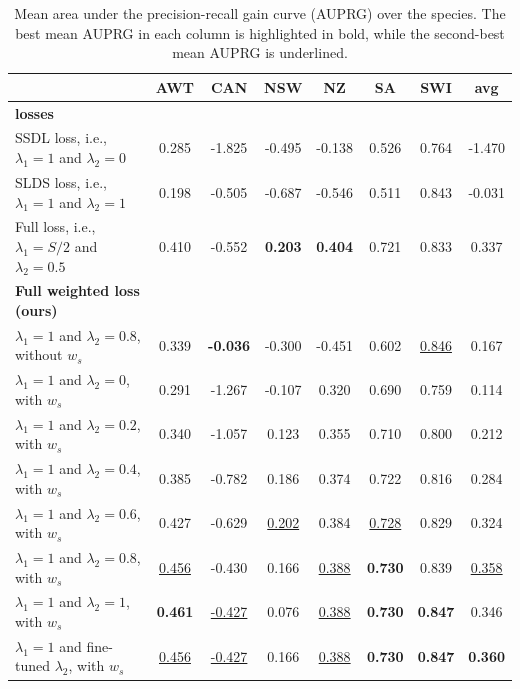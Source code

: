 \begin{table}[]
\centering
\caption{Mean area under the precision-recall gain curve (AUPRG) over the species. The best mean AUPRG in each column is highlighted in bold, while the second-best mean AUPRG is underlined.}

\setlength{\tabcolsep}{0.46\tabcolsep}  %
\renewcommand{\arraystretch}{1.2} %
\begin{tabular}{lccccccc}
                                                                          & AWT   & CAN   & NSW   & NZ    & SA    & SWI   & \textbf{avg}   \\ 
    \hline \hline
    \textbf{\cite{cole2023spatial} losses} \\
    SSDL loss, i.e., $\lambda_1 = 1$ and $\lambda_2=0$                    & 0.285 & -1.825 & -0.495 & -0.138 & 0.526 & 0.764 & -1.470 \\
    SLDS loss, i.e., $\lambda_1 = 1$ and $\lambda_2=1$                    & 0.198 & -0.505 & -0.687 & -0.546 & 0.511 & 0.843 & -0.031 \\
    Full loss, i.e., $\lambda_1 = S/2$ and $\lambda_2=0.5$                & 0.410 & -0.552 & \textbf{0.203} & \textbf{0.404} & 0.721 & 0.833 & 0.337 \\
    \hline \hline
    \textbf{Full weighted loss (ours)} \\  
    $\lambda_1=1 $ and $ \lambda_2=0.8$, without $w_s$                         & 0.339 & \textbf{-0.036} & -0.300 & -0.451 & 0.602 & \underline{0.846} & 0.167 \\
    \hline
    $\lambda_1=1 $ and $ \lambda_2=0$, with $w_s$                         & 0.291 & -1.267 & -0.107 & 0.320 & 0.690 & 0.759 & 0.114 \\
    $\lambda_1=1 $ and $ \lambda_2=0.2$, with $w_s$                       & 0.340 & -1.057 & 0.123 & 0.355 & 0.710 & 0.800 & 0.212 \\
    $\lambda_1=1 $ and $ \lambda_2=0.4$, with $w_s$                       & 0.385 & -0.782 & 0.186 & 0.374 & 0.722 & 0.816 & 0.284 \\
    $\lambda_1=1 $ and $ \lambda_2=0.6$, with $w_s$                       & 0.427 & -0.629 & \underline{0.202} & 0.384 & \underline{0.728} & 0.829 & 0.324 \\
    $\lambda_1=1 $ and $ \lambda_2=0.8$, with $w_s$                       & \underline{0.456} & -0.430 & 0.166 & \underline{0.388} & \textbf{0.730} & 0.839 & \underline{0.358} \\
    $\lambda_1=1 $ and $ \lambda_2=1$, with $w_s$                         & \textbf{0.461} & \underline{-0.427} & 0.076 & \underline{0.388} & \textbf{0.730} & \textbf{0.847} & 0.346 \\
    \hline
    $\lambda_1=1 $ and fine-tuned $\lambda_2$, with $w_s$                 & \underline{0.456} & \underline{-0.427} & 0.166 & \underline{0.388} & \textbf{0.730} & \textbf{0.847} & \textbf{0.360} \\
    \hline
\end{tabular}
\vspace{0.1cm} \\

\label{tab:comparison_aucprg}
\end{table}
